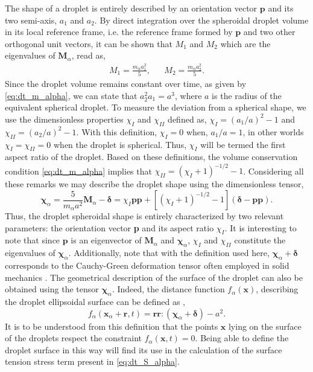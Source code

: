 The shape of a droplet is entirely described by an orientation vector $\textbf{p}$ and its two semi-axis, $a_1$ and $a_2$.  
By direct integration over the spheroidal droplet volume in its local reference frame, i.e. the reference frame formed by $\textbf{p}$ and two other orthogonal unit vectors, it can be shown that $M_1$ and $M_2$ which are the eigenvalues of $\textbf{M}_\alpha$, read as,
\begin{align*}
    M_1 = \frac{m_\alpha a_1^2}{5},
    && M_2 = \frac{m_\alpha a_2^2}{5}.
\end{align*}
Since the droplet volume remains constant over time, as given by  \ref{eq:dt_m_alpha}, we can state that $a_2^2 a_1 =a^3$, where $a$ is the radius of the equivalent spherical droplet.
To measure the deviation from a spherical shape, we use the dimensionless properties $\chi_I$ and $\chi_{II}$ defined as, $\chi_I = (a_1/a)^2 - 1$ and $\chi_{II} = (a_2/a)^2 - 1$. 
With this definition, $\chi_I = 0$ when, $a_1/a =1$, in other worlds $\chi_I =\chi_{II} = 0$ when the droplet is spherical. 
Thus, $\chi_I$ will be termed the first aspect ratio of the droplet.  
Based on these definitions, the volume conservation condition \eqref{eq:dt_m_alpha} implies that $\chi_{II} = (\chi_I + 1)^{-1/2} - 1$.
Considering all these remarks we may describe the droplet shape using the dimensionless tensor, 
\begin{equation*}
    \bm\chi_\alpha
    = \frac{5}{m_\alpha a^2}\textbf{M}_\alpha - \bm\delta
    = \chi_I \textbf{pp}
        +[(\chi_I + 1)^{-1/2} - 1 ] (\bm\delta - \textbf{pp}). 
\end{equation*}
Thus, the droplet spheroidal shape is entirely characterized by two relevant parameters: the orientation vector \textbf{p} and its aspect ratio $\chi_I$.
It is interesting to note that since $\textbf{p}$ is an eigenvector of $\textbf{M}_\alpha$ and $\bm\chi_\alpha$, $\chi_I$ and $\chi_{II}$ constitute the eigenvalues of $\bm\chi_\alpha$. 
Additionally, note that with the definition used here, $\bm\chi_\alpha +\bm\delta$ corresponds to the Cauchy-Green deformation tensor often employed in solid mechanics \citep{mwasame2018macroscopic}. 
The geometrical description of the surface of the droplet can also be obtained using the tensor $\bm\chi_\alpha$. 
Indeed, the distance function  $f_\alpha(\textbf{x})$, describing the droplet ellipsoidal surface can be defined as \citep{nadim1996concise},  
\begin{equation*}
    f_\alpha(\textbf{x}_\alpha +\textbf{r},t) = \textbf{rr}:(\bm\chi_\alpha +\bm\delta)-a^2.  
    \label{eq:distance_function}
\end{equation*}
It is to be understood from this definition that the points $\textbf{x}$ lying on the surface of the droplets respect the constraint $f_\alpha(\textbf{x},t) = 0$. 
Being able to define the droplet surface in this way will find its use in the calculation of the surface tension stress term present in \ref{eq:dt_S_alpha}. 

